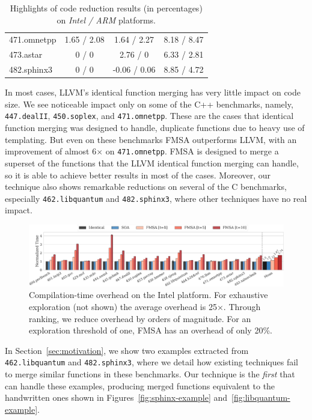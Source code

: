 \begin{table}[]
{\begin{tabular}{lccc}
471.omnetpp                               & 1.65 / 2.08        & 1.64 / 2.27   & 8.18 / 8.47             \\
\rowcolor{evencolor} 473.astar                                 & 0 / 0              & 2.76 / 0      & 6.33 / 2.81             \\
482.sphinx3                               & 0 / 0              & -0.06 / 0.06  & 8.85 / 4.72             \\
\bottomrule
\end{tabular}
}
\caption{Highlights of code reduction results (in percentages) on \textit{Intel / ARM} platforms. }
\label{tab:reduction}
\end{table}

In most cases, LLVM's identical function merging has very little impact on code
size.
We see noticeable impact only on some of the C++ benchmarks, namely,
\texttt{447.dealII}, \texttt{450.soplex}, and \texttt{471.omnetpp}.
These are the cases that identical function merging was designed to handle,
duplicate functions due to heavy use of templating.
But even on these benchmarks FMSA outperforms LLVM, with an improvement of
almost 6$\times$ on \texttt{471.omnetpp}.
FMSA is designed to merge a superset of the functions that the LLVM identical
function merging can handle, so it is able to achieve better results in most of
the cases.
Moreover, our technique also shows remarkable reductions on several of the
C benchmarks, especially \texttt{462.libquantum} and \texttt{482.sphinx3}, where
other techniques have no real impact.

\begin{figure}[t]
  \centering
  \includegraphics[width=\linewidth]{figs/compilation-time.pdf}
	\caption{Compilation-time overhead on the Intel platform. For exhaustive exploration (not shown) the average overhead is 25$\times$. Through ranking, we reduce overhead by orders of magnitude. For an exploration threshold of one, FMSA has an overhead of only 20\%.}
  \label{fig:compilation-time}
\end{figure}

In Section~\ref{sec:motivation}, we show two examples extracted from
\texttt{462.libquantum} and \texttt{482.sphinx3}, where we detail how existing
techniques fail to merge similar functions in these benchmarks.
Our technique is the \textit{first} that can handle these examples, producing
merged functions equivalent to the handwritten ones shown in
Figures~\ref{fig:sphinx-example} and~\ref{fig:libquantum-example}.


